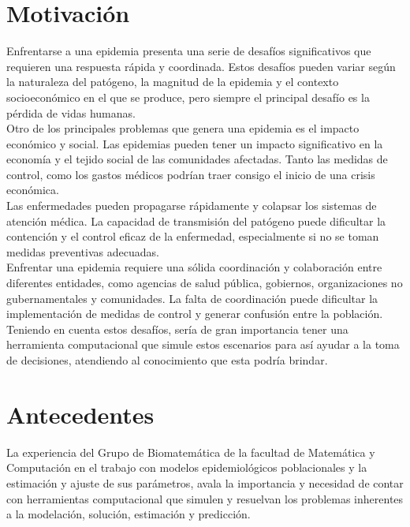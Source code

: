 \section{Motivación}
Enfrentarse a una epidemia presenta una serie de desafíos significativos que requieren 
una respuesta rápida y coordinada. Estos desafíos pueden variar según la naturaleza del 
patógeno, la magnitud de la epidemia y el contexto socioeconómico en el que se produce, 
pero siempre el principal desafío es la pérdida de vidas humanas.\\
Otro de los principales problemas que genera una epidemia es el impacto económico y social. 
Las epidemias pueden tener un impacto significativo en la economía y el tejido social 
de las comunidades afectadas. Tanto las medidas de control, como los gastos médicos podrían 
traer consigo el inicio de una crisis económica.\\
Las enfermedades pueden propagarse rápidamente y colapsar los sistemas de atención 
médica. La capacidad de transmisión del patógeno puede dificultar la contención y el control 
eficaz de la enfermedad, especialmente si no se toman medidas preventivas adecuadas.\\
Enfrentar una epidemia requiere una sólida coordinación y colaboración entre diferentes 
entidades, como agencias de salud pública, gobiernos, organizaciones no gubernamentales y 
comunidades. La falta de coordinación puede dificultar la implementación de medidas de 
control y generar confusión entre la población.\\
Teniendo en cuenta estos desafíos, sería de gran importancia tener una herramienta 
computacional que simule estos escenarios para así ayudar a la toma de decisiones, atendiendo 
al conocimiento que esta podría brindar.\\

\section{Antecedentes}
La experiencia del Grupo de Biomatemática de la facultad de Matemática y Computación en el trabajo 
con modelos epidemiológicos poblacionales y la estimación y ajuste de sus parámetros, avala la 
importancia y necesidad de contar con herramientas computacional que simulen y resuelvan los problemas 
inherentes a la modelación, solución, estimación y predicción.\\

